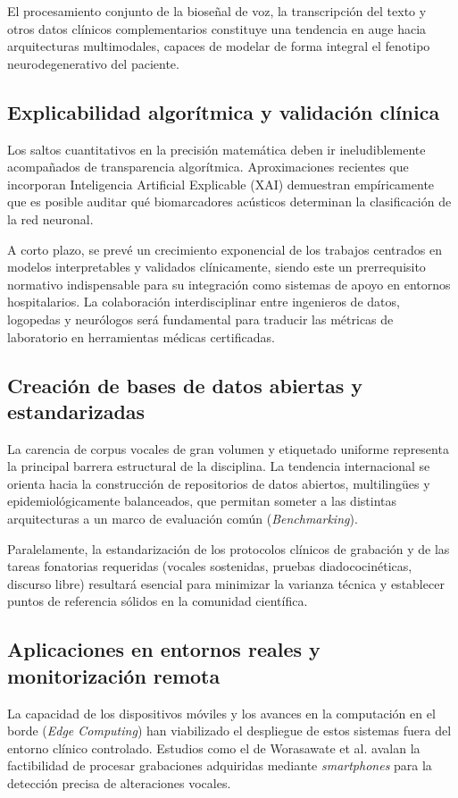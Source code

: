 El procesamiento conjunto de la bioseñal de voz, la transcripción del texto y otros datos clínicos complementarios constituye una tendencia en auge hacia arquitecturas multimodales, capaces de modelar de forma integral el fenotipo neurodegenerativo del paciente.

\subsection{Explicabilidad algorítmica y validación clínica}
Los saltos cuantitativos en la precisión matemática deben ir ineludiblemente acompañados de transparencia algorítmica. Aproximaciones recientes que incorporan Inteligencia Artificial Explicable (XAI) \cite{shen2024, muntaha2024} demuestran empíricamente que es posible auditar qué biomarcadores acústicos determinan la clasificación de la red neuronal. 

A corto plazo, se prevé un crecimiento exponencial de los trabajos centrados en modelos interpretables y validados clínicamente, siendo este un prerrequisito normativo indispensable para su integración como sistemas de apoyo en entornos hospitalarios. La colaboración interdisciplinar entre ingenieros de datos, logopedas y neurólogos será fundamental para traducir las métricas de laboratorio en herramientas médicas certificadas.

\subsection{Creación de bases de datos abiertas y estandarizadas}
La carencia de corpus vocales de gran volumen y etiquetado uniforme representa la principal barrera estructural de la disciplina. La tendencia internacional se orienta hacia la construcción de repositorios de datos abiertos, multilingües y epidemiológicamente balanceados, que permitan someter a las distintas arquitecturas a un marco de evaluación común (\textit{Benchmarking}). 

Paralelamente, la estandarización de los protocolos clínicos de grabación y de las tareas fonatorias requeridas (vocales sostenidas, pruebas diadococinéticas, discurso libre) resultará esencial para minimizar la varianza técnica y establecer puntos de referencia sólidos en la comunidad científica.

\subsection{Aplicaciones en entornos reales y monitorización remota}
La capacidad de los dispositivos móviles y los avances en la computación en el borde (\textit{Edge Computing}) han viabilizado el despliegue de estos sistemas fuera del entorno clínico controlado. Estudios como el de Worasawate et al. \cite{worasawate2021} avalan la factibilidad de procesar grabaciones adquiridas mediante \textit{smartphones} para la detección precisa de alteraciones vocales. 

